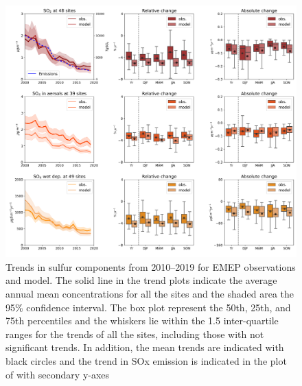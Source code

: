 \begin{figure}[h]
	\centering
	\includegraphics[width=0.74\paperwidth]{FIGS_TRENDS/sulfur_trends.png}
	\caption{\label{fig:SOx_trends}Trends in sulfur components from 2010--2019 for EMEP observations and model. The solid line in the trend plots indicate the average annual mean concentrations for all the sites and the shaded area the 95\% confidence interval. The box plot represent the 50th, 25th, and 75th percentiles and the whiskers lie within the 1.5 inter-quartile ranges for the trends of all the sites, including those with not significant trends. In addition, the mean trends are indicated with black circles and the trend in SOx emission is indicated in the plot of \soii with secondary y-axes}
\end{figure}

